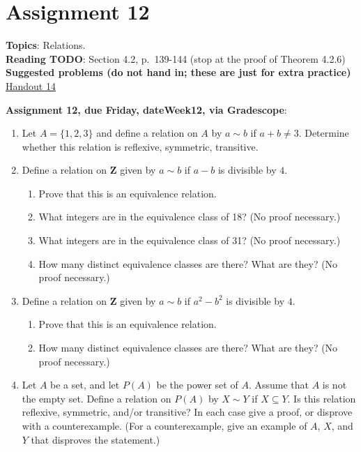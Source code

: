 \documentclass[12pt]{article}
\begin{document}
\section[12 (due \csname dateWeek12\endcsname): Relations]{Assignment 12}

\textbf{Topics}: Relations.
\\

\noindent \textbf{Reading TODO}: Section 4.2, p.~139-144 (stop at the proof of Theorem 4.2.6)
\\

\noindent \textbf{Suggested problems (do not hand in; these are just for extra practice)}
\href{https://www.math.emory.edu/~dzb/teaching/250Fall2021/handouts/250-H14-equivalence-relations.pdf}{Handout 14}



\noindent \textbf{Assignment 12, due Friday, \csname dateWeek12\endcsname, via Gradescope}:
\begin{enumerate}
\item Let $A = \{1,2,3\}$ and define a relation on $A$ by $a \sim b$ if $a + b \neq 3$. Determine whether this relation is reflexive, symmetric, transitive.
\item Define a relation on $\mathbf{Z}$ given by $a \sim b$ if $a-b$ is divisible by $4$.
 \begin{enumerate}
 \item Prove that this is an equivalence relation.
 \item What integers are in the equivalence class of 18? (No proof necessary.)
 \item What integers are in the equivalence class of 31? (No proof necessary.) 
 \item How many distinct equivalence classes are there? What are they? (No proof necessary.)
 \end{enumerate}
\item Define a relation on $\mathbf{Z}$ given by $a \sim b$ if $a^2-b^2$ is divisible by $4$.
 \begin{enumerate}
 \item Prove that this is an equivalence relation.
 \item How many distinct equivalence classes are there? What are they? (No proof necessary.)
 \end{enumerate} 
\item Let $A$ be a set, and let $P(A)$ be the power set of $A$. Assume that $A$ is not the empty set. Define a relation on $P(A)$ by $X \sim Y$ if $X \subseteq Y$. Is this relation reflexive, symmetric, and/or transitive? In each case give a proof, or disprove with a counterexample. (For a counterexample, give an example of $A$, $X$, and $Y$ that disproves the statement.)
\end{enumerate}
\end{document}
